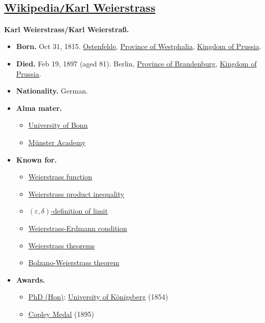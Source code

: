 \documentclass{article}
\begin{document}

\subsection{\href{https://en.wikipedia.org/wiki/Karl_Weierstrass}{Wikipedia\texttt{/}Karl Weierstrass}}
\textbf{Karl Weierstrass/Karl Weierstraß.}
\begin{itemize}
	\item \textbf{Born.} Oct 31, 1815. \href{https://en.wikipedia.org/wiki/Ennigerloh}{Ostenfelde}, \href{https://en.wikipedia.org/wiki/Province_of_Westphalia}{Province of Westphalia}, \href{https://en.wikipedia.org/wiki/Kingdom_of_Prussia}{Kingdom of Prussia}.
	\item \textbf{Died.} Feb 19, 1897 (aged 81). Berlin, \href{https://en.wikipedia.org/wiki/Province_of_Brandenburg}{Province of Brandenburg}, \href{https://en.wikipedia.org/wiki/Kingdom_of_Prussia}{Kingdom of Prussia}.
	\item \textbf{Nationality.} German.
	\item \textbf{Alma mater.}
	\begin{itemize}
		\item \href{https://en.wikipedia.org/wiki/University_of_Bonn}{University of Bonn}
		\item \href{https://en.wikipedia.org/wiki/University_of_M%C3%BCnster}{Münster Academy}
	\end{itemize}
	\item \textbf{Known for.}
	\begin{itemize}
		\item \href{https://en.wikipedia.org/wiki/Weierstrass_function}{Weierstrass function}
		\item \href{https://en.wikipedia.org/wiki/Weierstrass_product_inequality}{Weierstrass product inequality}
		\item \href{https://en.wikipedia.org/wiki/(%CE%B5,_%CE%B4)-definition_of_limit}{$(\varepsilon,\delta)$-definition of limit}
		\item \href{https://en.wikipedia.org/wiki/Weierstrass%E2%80%93Erdmann_condition}{Weierstrass-Erdmann condition}
		\item \href{https://en.wikipedia.org/wiki/Weierstrass_theorem_(disambiguation)}{Weierstrass theorems}
		\item \href{https://en.wikipedia.org/wiki/Bolzano-Weierstrass_theorem}{Bolzano-Weierstrass theorem}
	\end{itemize}
	\item \textbf{Awards.}
	\begin{itemize}
		\item \href{https://en.wikipedia.org/wiki/PhD_(Hon)}{PhD (Hon)}: \href{https://en.wikipedia.org/wiki/University_of_K%C3%B6nigsberg}{University of Königsberg} (1854)
		\item \href{https://en.wikipedia.org/wiki/Copley_Medal}{Copley Medal} (1895)
	\end{itemize}
\end{itemize}
\end{document}
